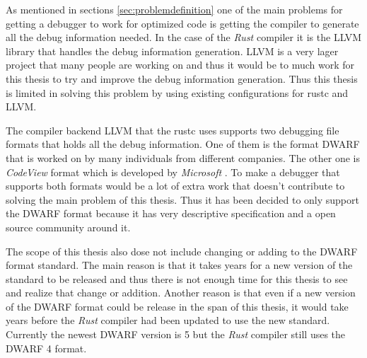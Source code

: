 




As mentioned in sections \ref{sec:problemdefinition} one of the main problems for getting a debugger to work for optimized code is getting the compiler to generate all the debug information needed.
In the case of the \emph{Rust} compiler it is the \gls{LLVM} library that handles the debug information generation.
\gls{LLVM} is a very lager project that many people are working on and thus it would be to much work for this thesis to try and improve the debug information generation.
Thus this thesis is limited in solving this problem by using existing configurations for \gls{rustc} and \gls{LLVM}.


The compiler backend \gls{LLVM} that the \gls{rustc} uses supports two debugging file formats that holds all the debug information.
One of them is the format \gls{DWARF} that is worked on by many individuals from different companies.
The other one is \emph{CodeView} format which is developed by \emph{Microsoft} \cite{llvm-dbs}.
To make a debugger that supports both formats would be a lot of extra work that doesn't contribute to solving the main problem of this thesis.
Thus it has been decided to only support the \gls{DWARF} format because it has very descriptive specification and a open source community around it.


The scope of this thesis also dose not include changing or adding to the \gls{DWARF} format standard.
The main reason is that it takes years for a new version of the standard to be released and thus there is not enough time for this thesis to see and realize that change or addition.
Another reason is that even if a new version of the \gls{DWARF} format could be release in the span of this thesis, it would take years before the \emph{Rust} compiler had been updated to use the new standard.
Currently the newest \gls{DWARF} version is 5 but the \emph{Rust} compiler still uses the \gls{DWARF} 4 format.


